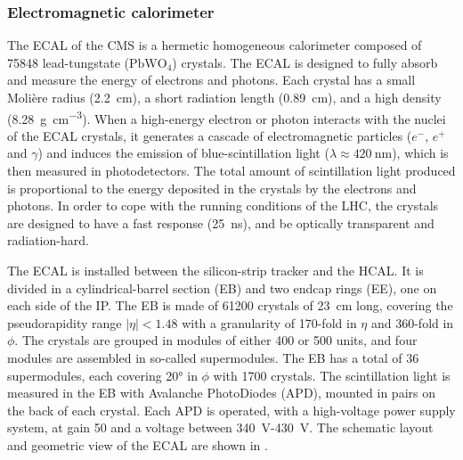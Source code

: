 \subsubsection{Electromagnetic calorimeter}

The ECAL of the CMS is a hermetic homogeneous calorimeter composed of 75848 lead-tungstate ($\mathrm{PbWO}_{4}$) crystals. The ECAL is designed to fully absorb and measure the energy of electrons and photons. Each crystal has a small Moli{\`e}re radius (\SI{2.2}{\cm}), a short radiation length (\SI{0.89}{\cm}), and a high density (\SI{8.28}{\gram\per\cm\cubed}). When a high-energy electron or photon interacts with the nuclei of the ECAL crystals, it generates a cascade of electromagnetic particles ($e^{-}$, $e^{+}$ and $\gamma$) and induces the emission of blue-scintillation light ($\lambda\approx\SI{420}{\nm}$), which is then measured in photodetectors. The total amount of scintillation light produced is proportional to the energy deposited in the crystals by the electrons and photons. In order to cope with the running conditions of the LHC, the crystals are designed to have a fast response (\SI{25}{\ns}), and be optically transparent and radiation-hard.

The ECAL is installed between the silicon-strip tracker and the HCAL. It is divided in a cylindrical-barrel section (EB) and two endcap rings (EE), one on each side of the IP. The EB is made of 61200 crystals of \SI{23}{\cm} long, covering the pseudorapidity range $|\eta|<1.48$ with a granularity of 170-fold in $\eta$ and 360-fold in $\phi$. The crystals are grouped in modules of either 400 or 500 units, and four modules are assembled in so-called supermodules. The EB has a total of 36 supermodules, each covering \ang{20} in $\phi$ with 1700 crystals. The scintillation light is measured in the EB with Avalanche PhotoDiodes (APD), mounted in pairs on the back of each crystal. Each APD is operated, with a high-voltage power supply system, at gain 50 and a voltage between \SI{340}{\V}-\SI{430}{\V}. The schematic layout and geometric view of the ECAL are shown in .

